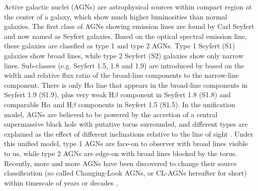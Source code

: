 \documentclass[twocolumn]{aastex63}
\begin{document}
Active galactic nuclei (AGNs) are astrophysical sources within compact region at the center of a galaxy, which show much higher luminosities than normal galaxies. The first class of AGNs showing emission lines are found by Carl Seyfert and now named as Seyfert galaxies. Based on the optical spectral emission line, these galaxies are classfied as type 1 and type 2 AGNs. Type 1 Seyfert (S1) galaxies show broad lines, while type 2 Seyfert (S2) galaxies show only narrow lines. Sub-classes (e.g. Seyfert 1.5, 1.8 and 1.9) are introduced by \citet{1976MNRAS.176P..61O,1981ApJ...249..462O} based on the width and relative flux ratio of the broad-line components to the narrow-line component. There is only H$\alpha$ line that appears in the broad-line components in Seyfert 1.9 (S1.9), plus  
very weak H$\beta$ component in Seyfert 1.8 (S1.8) and comparable H$\alpha$ and H$\beta$ components in Seyfert 1.5 (S1.5). In the unification model, AGNs are believed to be powered by the accretion of a central supermassive black hole with putative torus surrounded, and different types are explained as the effect of different inclinations relative to the line of sight \citep[see][]{1993ARA&A..31..473A}. Under this unified model, type 1 AGNs are face-on to observer with broad lines visible to us, while type 2 AGNs are edge-on with broad lines blocked by the torus.
Recently, more and more AGNs have been discovered to change their source classification (so called Changing-Look AGNs, or CL-AGNs hereafter for short) within timescale of years or decades \citep[e.g.][]{2016MNRAS.457..389M, 2016ApJ...826..188R, 2018ApJ...864...27S, 2019ApJ...874....8M,2020MNRAS.491.4925G}, 
\end{document}
